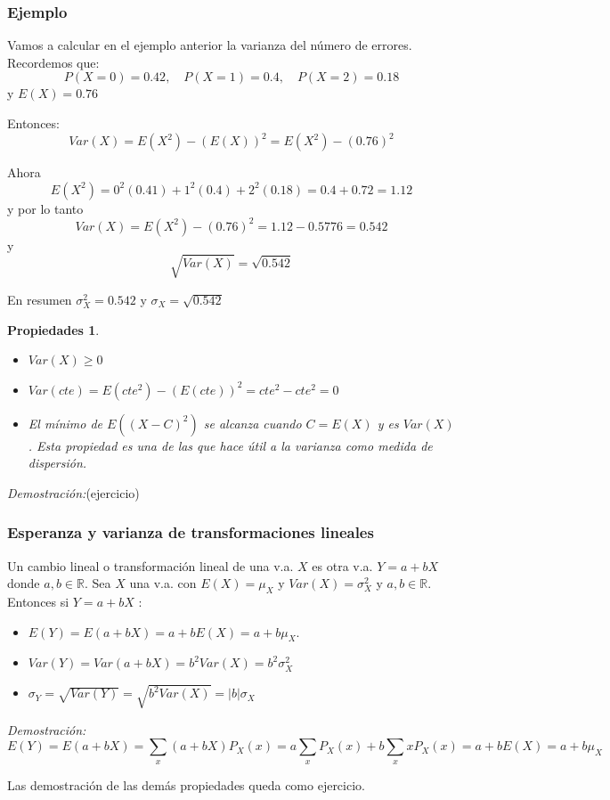 \documentclass[handout]{beamer}\usepackage[]{graphicx}\usepackage[]{color}
\newcommand{\RR}{\mathbb{R}}
\renewcommand{\geq}{\geqslant}
\theoremstyle{plain}
\newtheorem{prop}{Propiedades}
\theoremstyle{definition}
\begin{document}
\begin{frame}

\frametitle{Ejemplo}
    Vamos a calcular en  el ejemplo anterior la varianza del número de errores.
    Recordemos que:
    $$P(X=0)=0.42,\quad P(X=1)=0.4, \quad P(X=2)=0.18$$
    y  $E(X)=0.76$

    Entonces:
    $$Var(X)=E(X^2)-(E(X))^2 = E(X^2)-(0.76)^2$$

  Ahora
  $$E(X^2)= 0^2 (0.41)+ 1^2 (0.4)+ 2^2 (0.18)=0.4+0.72=1.12$$
  y por lo tanto
  $$Var(X)= E(X^2)-(0.76)^2=1.12-0.5776=0.542$$
  y $$\sqrt{Var(X)}=\sqrt{0.542}$$

  En resumen $\sigma_{X}^2=0.542$ y $\sigma_{X}=\sqrt{0.542}$
     
\end{frame}

\begin{frame}

    \begin{prop}

    \begin{itemize}
    \item $Var(X)\geq 0$
    \item $Var(cte)=E(cte^2)-(E(cte))^2= cte^2 - cte^2=0$
    \item El mínimo de $E((X-C)^2)$ se alcanza cuando $C=E(X)$ y es $Var(X)$. Esta
    propiedad es una de las que hace útil a la varianza como medida de dispersión.
    \end{itemize}

    \end{prop}

       \textit{Demostración:}(ejercicio)


\end{frame}

\subsubsection{Esperanza y varianza de transformaciones lineales}

\begin{frame}

 Un cambio lineal o transformación lineal
de una v.a. $X$ es otra v.a. $Y= a+ b X$  donde $a,b\in\RR$. Sea $X$ una v.a. con
$E(X)=\mu_{X}$ y $Var(X)=\sigma_{X}^2$ y $a,b\in\RR$. Entonces si $Y=a+b X$ :
\begin{itemize}
    \item $E(Y)=E(a + b X)=a+ b E(X)= a + b \mu_{X}$.
    \item $Var(Y)=Var(a+bX)=b^2 Var(X)= b^2 \sigma_{X}^2$
    \item $\sigma_{Y}=\sqrt{Var(Y)}=\sqrt{b^2 Var(X)}=|b| \sigma_{X}$
    \end{itemize}
    \textit{Demostración:}
    $$
E(Y)=E(a+bX)=\sum_{x}(a+bX) P_{X}(x)= a \sum_{x} P_{X}(x) + b \sum_{x} x P_{X}(x) =a + b
E(X)=a + b \mu_{X}
$$

Las demostración de las demás propiedades queda como ejercicio.

\end{frame}
\end{document}
